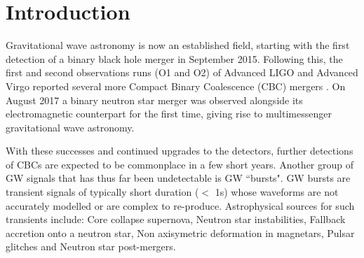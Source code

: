 \documentclass[12pt]{iopart}
\begin{document}
\section{Introduction}

%
Gravitational wave astronomy is now an established field, starting with the first
detection of a binary black hole merger \cite{Abbott2016} in September 2015.
Following this, the first and second observations runs (O1 and O2) of Advanced
LIGO and Advanced Virgo \cite{Prospects-dets, AdvLIGO, AdvLIGO2, AdvVIRGO} reported several more Compact Binary Coalescence (CBC)
mergers \cite{Abbott2016a, Abbott2017, Abbott2017a, Abbott2017b}. On August
2017 a binary neutron star merger was observed alongside its electromagnetic
counterpart for the first time, giving rise to multimessenger gravitational
wave astronomy. 

%
With these successes and continued upgrades to the detectors, further detections of CBCs are expected to be commonplace in a few short years. Another group of GW signals that has thus far been undetectable is GW ``bursts".  GW bursts are transient signals of typically short duration ($<$ 1s) whose
waveforms are not accurately modelled or are complex to re-produce.
Astrophysical sources for such transients include: Core collapse supernova,
Neutron star instabilities, Fallback accretion onto a neutron star, Non
axisymetric deformation in magnetars, Pulsar glitches and Neutron star
post-mergers. 
\end{document}
